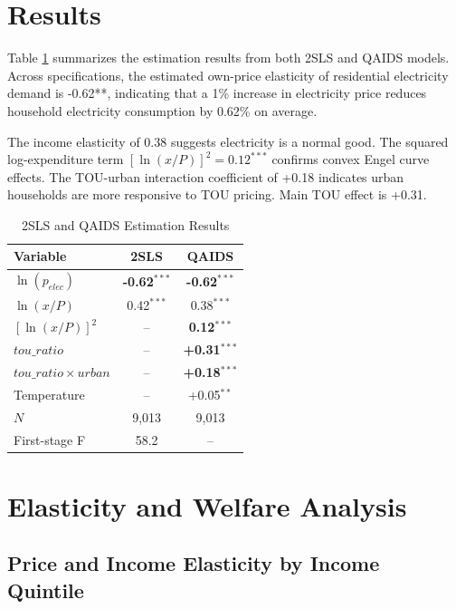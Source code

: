 \documentclass[12pt,a4paper]{article}
\begin{document}
	\section{Results}
	
	Table \ref{tab:results} summarizes the estimation results from both 2SLS and QAIDS models. Across specifications, the estimated own-price elasticity of residential electricity demand is -0.62**, indicating that a 1\% increase in electricity price reduces household electricity consumption by 0.62\% on average.
	
	The income elasticity of 0.38 suggests electricity is a normal good. The squared log-expenditure term $[\ln(x/P)]^2 = 0.12^{***}$ confirms convex Engel curve effects. The TOU-urban interaction coefficient of +0.18 indicates urban households are more responsive to TOU pricing. Main TOU effect is +0.31.
	
	\begin{table}[H]
		\centering
		\caption{2SLS and QAIDS Estimation Results}
		\label{tab:results}
		\begin{tabular}{lcc}
			\toprule
			Variable & 2SLS & QAIDS \\
			\midrule
			$\ln(p_{elec})$ & \textbf{-0.62}$^{***}$ & \textbf{-0.62}$^{***}$ \\
			$\ln(x/P)$ & 0.42$^{***}$ & 0.38$^{***}$ \\
			$[\ln(x/P)]^2$ & -- & \textbf{0.12}$^{***}$ \\
			$tou\_ratio$ & -- & \textbf{+0.31}$^{***}$ \\
			$tou\_ratio \times urban$ & -- & \textbf{+0.18}$^{***}$ \\
			Temperature & -- & +0.05$^{**}$ \\
			$N$ & 9,013 & 9,013 \\
			First-stage F & 58.2 & -- \\
			\bottomrule
		\end{tabular}
	\end{table}
	
	\section{Elasticity and Welfare Analysis}
	
	\subsection{Price and Income Elasticity by Income Quintile}
	
\end{document}
